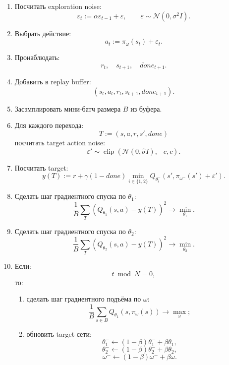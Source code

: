 \documentclass[12pt,a4paper]{article}
\begin{document}
\begin{enumerate}
    \item Посчитать exploration noise:
    \[
    \varepsilon_t
    :=
    \alpha\varepsilon_{t-1}
    +
    \varepsilon,
    \qquad
    \varepsilon\sim\mathcal N(0,\sigma^2 I).
    \]

    \item Выбрать действие:
    \[
    a_t
    :=
    \pi_\omega(s_t)+\varepsilon_t.
    \]

    \item Пронаблюдать:
    \[
    r_t,\quad s_{t+1},\quad done_{t+1}.
    \]

    \item Добавить в replay buffer:
    \[
    (s_t,a_t,r_t,s_{t+1},done_{t+1}).
    \]

    \item Засэмплировать мини-батч размера $B$ из буфера.

    \item Для каждого перехода:
    \[
    T:=(s,a,r,s',done)
    \]
    посчитать target action noise:
    \[
    \varepsilon'
    \sim
    \operatorname{clip}
    \left(
    \mathcal N(0,\hat\sigma I),
    -c,
    c
    \right).
    \]

    \item Посчитать target:
    \[
    y(T)
    :=
    r
    +
    \gamma(1-done)
    \min_{i\in\{1,2\}}
    Q_{\theta_i^-}
    \left(
    s',
    \pi_{\omega^-}(s')+\varepsilon'
    \right).
    \]

    \item Сделать шаг градиентного спуска по $\theta_1$:
    \[
    \frac{1}{B}
    \sum_T
    \left(
    Q_{\theta_1}(s,a)-y(T)
    \right)^2
    \to
    \min_{\theta_1}.
    \]

    \item Сделать шаг градиентного спуска по $\theta_2$:
    \[
    \frac{1}{B}
    \sum_T
    \left(
    Q_{\theta_2}(s,a)-y(T)
    \right)^2
    \to
    \min_{\theta_2}.
    \]

    \item Если:
    \[
    t\bmod N=0,
    \]
    то:
    \begin{enumerate}
        \item сделать шаг градиентного подъёма по $\omega$:
        \[
        \frac{1}{B}
        \sum_{s\in B}
        Q_{\theta_1}(s,\pi_\omega(s))
        \to
        \max_\omega;
        \]

        \item обновить target-сети:
        \[
        \theta_1^-
        \leftarrow
        (1-\beta)\theta_1^-+\beta\theta_1,
        \]
        \[
        \theta_2^-
        \leftarrow
        (1-\beta)\theta_2^-+\beta\theta_2,
        \]
        \[
        \omega^-
        \leftarrow
        (1-\beta)\omega^-+\beta\omega.
        \]
    \end{enumerate}
\end{enumerate}
\end{document}
